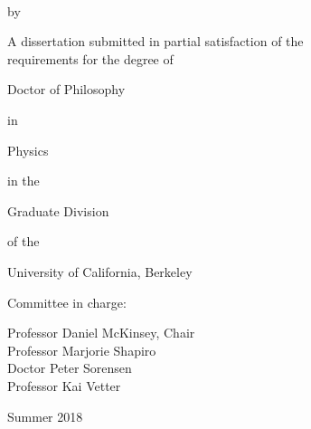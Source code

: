 
\begin{titlepage}

\begin{center}
\large

\hfill
\vfill

\begingroup
\color{title}\Large\spacedallcaps{\myTitle} \\ \bigskip %
\endgroup

by \\ \bigskip

\spacedallcaps{\myName} %

\vfill

A dissertation submitted in partial satisfaction of the \\
requirements for the degree of \\ \bigskip

Doctor of Philosophy \\ \smallskip

in \\ \smallskip

Physics \\ \smallskip

in the \\ \smallskip

Graduate Division \\ \smallskip

of the \\ \smallskip

University of California, Berkeley


\vfill

Committee in charge: \\ \smallskip

Professor Daniel McKinsey, Chair \\
Professor Marjorie Shapiro \\
Doctor Peter Sorensen \\
Professor Kai Vetter \\ \bigskip\bigskip

Summer 2018

\end{center}

\end{titlepage}
